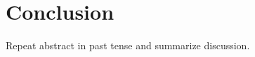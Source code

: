 \documentclass[../thesis.tex]{subfiles}
\begin{document}
\graphicspath{{../}}

\chapter{Conclusion}
\label{chapter:conclusion}

Repeat abstract in past tense and summarize discussion.
\end{document}
